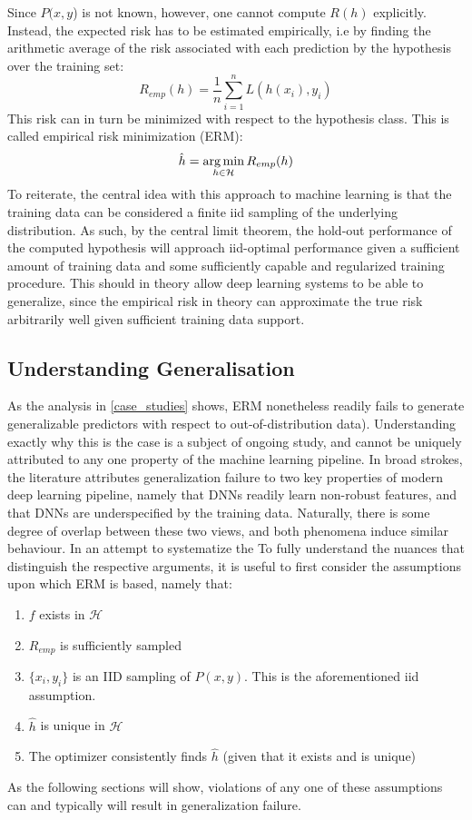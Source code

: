 		Since \(P(x,y\)) is not known, however, one cannot compute \(R(h)\) explicitly. Instead, the expected risk has to be estimated empirically, i.e by finding the arithmetic average of the risk associated with each prediction by the hypothesis over the training set:
		\begin{equation}
		R_{emp}(h) = \frac{1}{n}\sum_{i=1}^{n}L(h(x_i), y_i)
		\end{equation}
		This risk can in turn be minimized with respect to the hypothesis class. This is called empirical risk minimization (ERM):
		\begin{equation}
		\hat{h} = \operatorname*{arg\,min}_{h \in \mathcal{H}}R_{emp}(h)
		\end{equation}
		To reiterate, the central idea with this approach to machine learning is that the training data can be considered a finite iid sampling of the underlying distribution. As such, by the central limit theorem, the hold-out performance of the computed hypothesis will approach iid-optimal performance given a sufficient amount of training data and some sufficiently capable and regularized training procedure. This should in theory allow deep learning systems to be able to generalize, since the empirical risk in theory can approximate the true risk arbitrarily well given sufficient training data support.
	\subsection{Understanding Generalisation}
		As the analysis in \ref{case_studies} shows, ERM nonetheless readily fails to generate generalizable predictors with respect to out-of-distribution data). Understanding exactly why this is the case is a subject of ongoing study, and cannot be uniquely attributed to any one property of the machine learning pipeline. In broad strokes, the literature attributes generalization failure to two key properties of modern deep learning pipeline, namely that DNNs readily learn non-robust features, and that DNNs are underspecified by the training data. 
		Naturally, there is some degree of overlap between these two views, and both phenomena induce similar behaviour. In an attempt to systematize the To fully understand the nuances that distinguish the respective arguments, it is useful to first consider the assumptions upon which ERM is based, namely that:
		\begin{enumerate}
			\item \(f\) exists in \(\mathcal{H}\) \label{underfit}
			\item \(R_{emp}\) is sufficiently sampled \label{overfit} %
			\item \(\{x_i, y_i\}\) is an IID sampling of \(P(x,y)\). This is the aforementioned iid assumption. \label{structural_misalignment}
			\item \(\hat{h}\) is unique in \(\mathcal{H}\)\label{underspecification}
			\item The optimizer consistently finds \(\hat{h}\) (given that it exists and is unique)\label{opt}
		\end{enumerate}
		As the following sections will show, violations of any one of these assumptions can and typically will result in generalization failure.  

